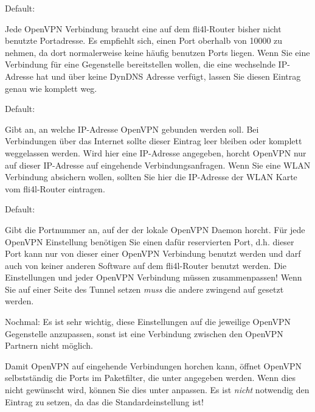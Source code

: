 \begin{description}
  Default: 

  Jede OpenVPN Verbindung braucht eine auf dem fli4l-Router bisher
  nicht benutzte Portadresse. Es empfiehlt sich, einen Port oberhalb
  von 10000 zu nehmen, da dort normalerweise keine häufig benutzen
  Ports liegen. Wenn Sie eine Verbindung für eine Gegenstelle
  bereitstellen wollen, die eine wechselnde IP-Adresse hat und über
  keine DynDNS Adresse verfügt, lassen Sie diesen Eintrag genau wie
   komplett weg.


  Default: 

  Gibt an, an welche IP-Adresse OpenVPN gebunden werden soll. Bei
  Verbindungen über das Internet sollte dieser Eintrag leer bleiben
  oder komplett weggelassen werden.  Wird hier eine IP-Adresse
  angegeben, horcht OpenVPN nur auf dieser IP-Adresse auf eingehende
  Verbindungsanfragen. Wenn Sie eine WLAN Verbindung absichern wollen,
  sollten Sie hier die IP-Adresse der WLAN Karte vom fli4l-Router
  eintragen.


  Default: 

  Gibt die Portnummer an, auf der der lokale OpenVPN Daemon
  horcht. Für jede OpenVPN Einstellung benötigen Sie einen dafür
  reservierten Port, d.h. dieser Port kann nur von dieser einer
  OpenVPN Verbindung benutzt werden und darf auch von keiner anderen
  Software auf dem fli4l-Router benutzt werden.  Die Einstellungen
   und 
  jeder OpenVPN Verbindung müssen zusammenpassen! Wenn Sie auf einer
  Seite des Tunnel  setzen
  \emph{muss} die andere zwingend auf
   gesetzt werden.

  Nochmal: Es ist sehr wichtig, diese Einstellungen auf die jeweilige
  OpenVPN Gegenstelle anzupassen, sonst ist eine Verbindung zwischen
  den OpenVPN Partnern nicht möglich.

  Damit OpenVPN auf eingehende Verbindungen horchen kann, öffnet
  OpenVPN selbstständig die Ports im Paketfilter, die unter
   angegeben werden. Wenn dies nicht
  gewünscht wird, können Sie dies unter
  anpassen. Es ist \emph{nicht} notwendig den Eintrag
   zu setzen, da das die
  Standardeinstellung ist!


\end{description}
